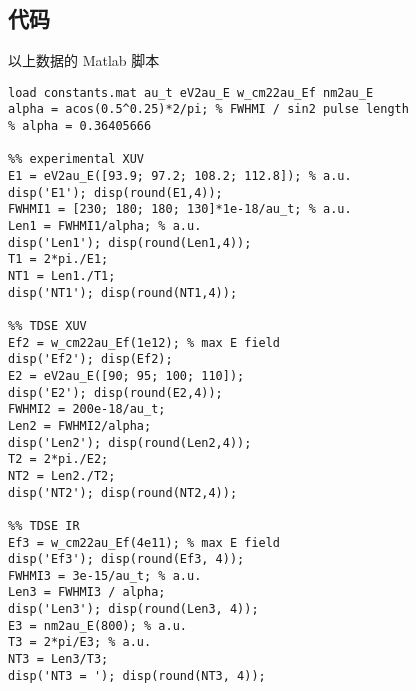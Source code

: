 \subsection{代码}
以上数据的 Matlab 脚本
\begin{lstlisting}[language=MyMatlab]
load constants.mat au_t eV2au_E w_cm22au_Ef nm2au_E
alpha = acos(0.5^0.25)*2/pi; % FWHMI / sin2 pulse length
% alpha = 0.36405666

%% experimental XUV
E1 = eV2au_E([93.9; 97.2; 108.2; 112.8]); % a.u.
disp('E1'); disp(round(E1,4));
FWHMI1 = [230; 180; 180; 130]*1e-18/au_t; % a.u.
Len1 = FWHMI1/alpha; % a.u.
disp('Len1'); disp(round(Len1,4));
T1 = 2*pi./E1;
NT1 = Len1./T1;
disp('NT1'); disp(round(NT1,4));

%% TDSE XUV
Ef2 = w_cm22au_Ef(1e12); % max E field
disp('Ef2'); disp(Ef2);
E2 = eV2au_E([90; 95; 100; 110]);
disp('E2'); disp(round(E2,4));
FWHMI2 = 200e-18/au_t;
Len2 = FWHMI2/alpha;
disp('Len2'); disp(round(Len2,4));
T2 = 2*pi./E2;
NT2 = Len2./T2;
disp('NT2'); disp(round(NT2,4));

%% TDSE IR
Ef3 = w_cm22au_Ef(4e11); % max E field
disp('Ef3'); disp(round(Ef3, 4));
FWHMI3 = 3e-15/au_t; % a.u.
Len3 = FWHMI3 / alpha;
disp('Len3'); disp(round(Len3, 4));
E3 = nm2au_E(800); % a.u.
T3 = 2*pi/E3; % a.u.
NT3 = Len3/T3;
disp('NT3 = '); disp(round(NT3, 4));
\end{lstlisting}
